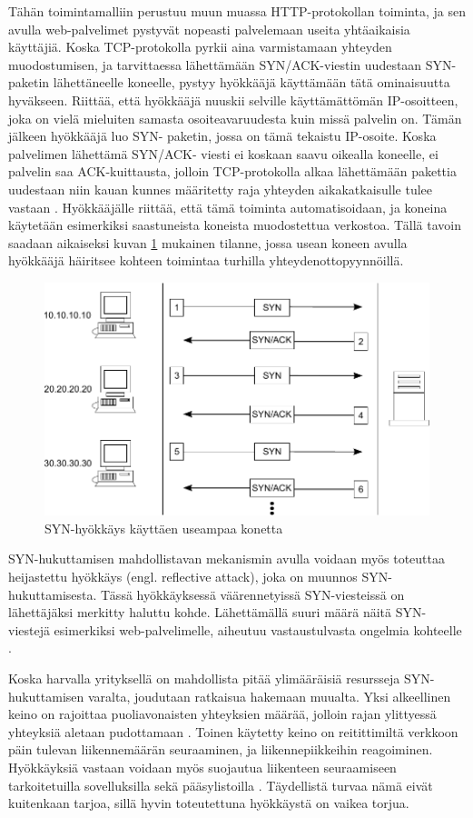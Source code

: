Tähän toimintamalliin perustuu muun muassa HTTP-protokollan toiminta, ja sen avulla 
web-palvelimet pystyvät nopeasti palvelemaan useita yhtäaikaisia käyttäjiä.
Koska TCP-protokolla pyrkii aina varmistamaan yhteyden muodostumisen, ja tarvittaessa 
lähettämään SYN/ACK-viestin uudestaan SYN-paketin lähettäneelle koneelle, pystyy hyökkääjä
käyttämään tätä ominaisuutta hyväkseen. Riittää, että hyökkääjä nuuskii
selville käyttämättömän IP-osoitteen, joka on vielä mieluiten samasta
osoiteavaruudesta kuin missä palvelin on. Tämän jälkeen hyökkääjä luo SYN-
paketin, jossa on tämä tekaistu IP-osoite. Koska palvelimen lähettämä SYN/ACK-
viesti ei koskaan saavu oikealla koneelle, ei palvelin saa ACK-kuittausta,
jolloin TCP-protokolla alkaa lähettämään pakettia uudestaan niin kauan kunnes
määritetty raja yhteyden aikakatkaisulle tulee vastaan \cite{STACK}. Hyökkääjälle
riittää, että tämä toiminta automatisoidaan, ja koneina käytetään esimerkiksi
saastuneista koneista muodostettua verkostoa. Tällä tavoin saadaan aikaiseksi
kuvan \ref{syn} mukainen tilanne, jossa usean koneen avulla hyökkääjä häiritsee
kohteen toimintaa turhilla yhteydenottopyynnöillä.

\begin{figure}[hpt]
\centering
\includegraphics[width=12cm]{pics/synflood.pdf}
\caption{SYN-hyökkäys käyttäen useampaa konetta}
\label{syn}
\end{figure}

SYN-hukuttamisen mahdollistavan mekanismin avulla voidaan myös toteuttaa
heijastettu hyökkäys (engl. reflective attack), joka on muunnos 
SYN-hukuttamisesta. Tässä hyökkäyksessä väärennetyissä SYN-viesteissä on
lähettäjäksi merkitty haluttu kohde. Lähettämällä suuri määrä näitä SYN-viestejä 
esimerkiksi web-palvelimelle, aiheutuu vastaustulvasta ongelmia
kohteelle \cite{STACK}.

Koska harvalla yrityksellä on mahdollista pitää ylimääräisiä resursseja SYN-
hukuttamisen varalta, joudutaan ratkaisua hakemaan muualta. Yksi
alkeellinen keino on rajoittaa puoliavonaisten yhteyksien määrää, jolloin rajan
ylittyessä yhteyksiä aletaan pudottamaan \cite{TCP}. Toinen käytetty keino on
reitittimiltä verkkoon päin tulevan liikennemäärän seuraaminen, ja
liikennepiikkeihin reagoiminen. Hyökkäyksiä vastaan voidaan myös suojautua
liikenteen seuraamiseen tarkoitetuilla sovelluksilla sekä pääsylistoilla \cite{STACK}.
Täydellistä turvaa nämä eivät kuitenkaan tarjoa, sillä hyvin toteutettuna
hyökkäystä on vaikea torjua.

